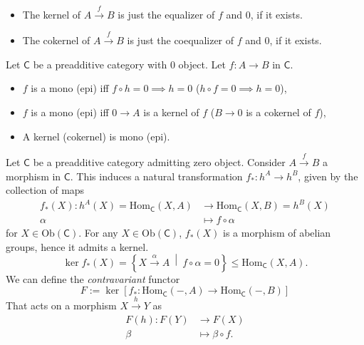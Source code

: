 \begin{rem}\leavevmode\vspace{-.2\baselineskip}
	\begin{itemize}
		\item The kernel of $A \xrightarrow{f} B$ is just the equalizer of $f$ and $0$, if it exists.
		\item The cokernel of $A \xrightarrow{f} B$ is just the coequalizer of $f$ and $0$, if it exists.
	\end{itemize}
\end{rem}

\begin{lem}
	Let $\mathsf{C}$ be a preadditive category with $0$ object.
	Let $f: A \to B$ in $\mathsf{C}$.
	\begin{itemize}
		\item $f$ is a mono (epi) iff $f \circ h = 0 \implies h = 0$ ($h \circ f = 0 \implies h = 0$),
		\item $f$ is a mono (epi) iff $0 \to A$ is a kernel of $f$ ($B \to 0$ is a cokernel of $f$),
		\item A kernel (cokernel) is mono (epi).
	\end{itemize}
\end{lem} 

\begin{defn}
	Let $\mathsf{C}$ be a preadditive category admitting zero object.
	Consider $A \xrightarrow{f} B$ a morphism in $\mathsf{C}$.
	This induces a natural transformation 
	$f_*\colon h^A \to h^B$, given by the collection of maps
	\begin{align}
		f_*(X): h^A(X) = \mathrm{Hom}_{\mathsf{C}} \left( X, A \right) &\to \mathrm{Hom}_{\mathsf{C}} \left( X, B \right) = h^B(X) \\
		\alpha &\mapsto f \circ \alpha
	\end{align} 
	for $X \in \mathrm{Ob} \left(\mathsf{C}\right)$.
	For any $X \in \mathrm{Ob} \left(\mathsf{C}\right)$,
	$f_*(X)$ is a morphism of abelian groups, hence it admits a kernel.
	\begin{equation}
		\ker f_*(X) = \left\{ X \xrightarrow{\alpha} A  \ \middle|\ f \circ \alpha = 0\right\} \leq \mathrm{Hom}_{\mathsf{C}} \left( X, A \right)
	.\end{equation} 
	We can define the \textit{contravariant} functor
	\begin{equation}
	F := \ker \left[ f_*: \mathrm{Hom}_{\mathsf{C}} \left( -, A \right) \to \mathrm{Hom}_{\mathsf{C}} \left( -, B \right) \right]
	\end{equation} 
	That acts on a morphism $X \xrightarrow{h} Y$ as
	 \begin{align}
		 F(h): F(Y) &\to F(X) \\
		\beta &\mapsto \beta \circ f
	.\end{align} 
\end{defn}

